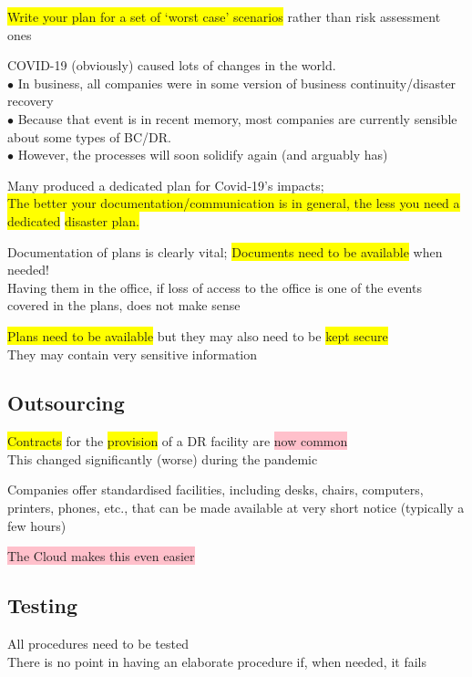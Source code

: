 \documentclass[tikz,border=10pt]{project_plan}
\newcommand{\bulletPoint}{\hspace{-3.1pt}$\bullet$ \hspace{5pt}}
\begin{document}
\colorbox{yellow}{Write your plan for a set of ‘worst case’ scenarios} rather than risk assessment ones

COVID-19 (obviously) caused lots of changes in the world.\\
\bulletPoint In business, all companies were in some version of business continuity/disaster recovery \\
\bulletPoint Because that event is in recent memory, most companies are currently sensible about some types of BC/DR. \\
\bulletPoint However, the processes will soon solidify again (and arguably has)

Many produced a dedicated plan for Covid-19's impacts;\\
\colorbox{yellow}{The better your documentation/communication is in general, the less you need a dedicated} \colorbox{yellow}{disaster plan.}

Documentation of plans is clearly vital; \colorbox{yellow}{Documents need to be available} when needed!\\
Having them in the office, if loss of access to the office is one of the events
covered in the plans, does not make sense

\colorbox{yellow}{Plans need to be available} but they may also need to be \colorbox{yellow}{kept secure}\\
They may contain very sensitive information

\subsection{Outsourcing}

\colorbox{yellow}{Contracts} for the \colorbox{yellow}{provision} of a DR facility are \colorbox{pink}{now common}\\
This changed significantly (worse) during the pandemic

Companies offer standardised facilities, including desks, chairs, computers,
printers, phones, etc., that can be made available at very short notice
(typically a few hours)

\colorbox{pink}{The Cloud makes this even easier}

\subsection{Testing}

All procedures need to be tested \\
There is no point in having an elaborate procedure if, when needed, it fails
\end{document}
